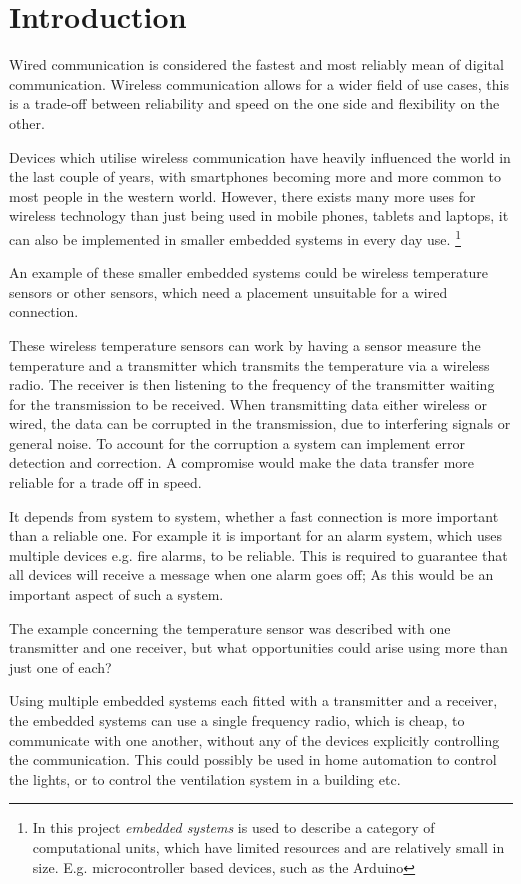 \chapter{Introduction}
\vspace{-20pt}
Wired communication is considered the fastest and  most reliably mean of digital communication.
Wireless communication allows for a wider field of use cases, this is a trade-off between reliability and speed on the one side and flexibility on the other. \cite{wirelessTradeoffs}

Devices which utilise wireless communication have heavily influenced the world in the last couple of years, with smartphones becoming more and more common to most people in the western world. \cite{2013-SmartPhoneUse}
However, there exists many more uses for wireless technology than just being used in mobile phones, tablets and laptops, it can also be implemented in smaller embedded systems in every day use. 
\footnote{In this project \textit{embedded systems} is used to describe a category of computational units, which have limited resources and are relatively small in size. 
E.g. microcontroller based devices, such as the Arduino}

An example of these smaller embedded systems could be wireless temperature sensors or other sensors, which need a placement unsuitable for a wired connection.

These wireless temperature sensors can work by having a sensor measure the temperature and a transmitter which transmits the temperature via a wireless radio.
The receiver is then listening to the frequency of the transmitter waiting for the transmission to be received.
When transmitting data either wireless or wired, the data can be corrupted in the transmission, due to interfering signals or general noise.
To account for the corruption a system can implement error detection and correction.
A compromise would make the data transfer more reliable for a trade off in speed.

It depends from system to system, whether a fast connection is more important than a reliable one.
For example it is important for an alarm system, which uses multiple devices e.g. fire alarms, to be reliable.
This is required to guarantee that all devices will receive a message when one alarm goes off;
As this would be an important aspect of such a system.

The example concerning the temperature sensor was described with one transmitter and one receiver, but what opportunities could arise using more than just one of each?

\bigskip

Using multiple embedded systems each fitted with a transmitter and a receiver, the embedded systems can use a single frequency radio, which is cheap, to communicate with one another, without any of the devices explicitly controlling the communication.
This could possibly be used in home automation to control the lights, or to control the ventilation system in a building etc.
